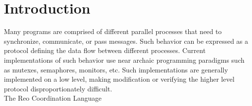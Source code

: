 \section{Introduction}
Many programs are comprised of different parallel processes that need to synchronize, communicate, or pass messages. Such behavior can be expressed as a protocol defining the data flow between different processes. Current implementations of such behavior use near archaic programming paradigms such as mutexes, semaphores, monitors, etc. Such implementations are generally implemented on a low level, making modification or verifying the higher level protocol disproportionately difficult.\\
The Reo Coordination Language \cite{reo}
